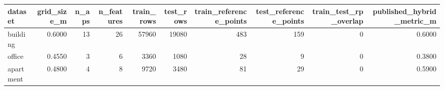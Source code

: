 \begin{tabular}{lrrrrrrrrr}
\toprule
dataset & grid\_size\_m & n\_aps & n\_features & train\_rows & test\_rows & train\_reference\_points & test\_reference\_points & train\_test\_rp\_overlap & published\_hybrid\_metric\_m \\
\midrule
building & 0.6000 & 13 & 26 & 57960 & 19080 & 483 & 159 & 0 & 0.6000 \\
office & 0.4550 & 3 & 6 & 3360 & 1080 & 28 & 9 & 0 & 0.3800 \\
apartment & 0.4800 & 4 & 8 & 9720 & 3480 & 81 & 29 & 0 & 0.5900 \\
\bottomrule
\end{tabular}

